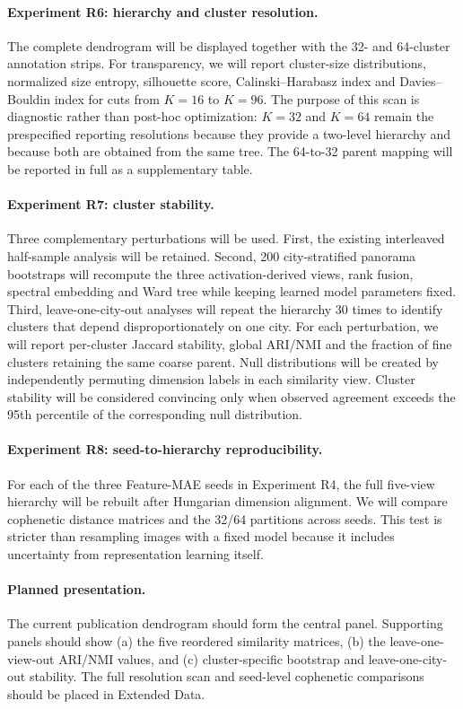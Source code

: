 \paragraph{Experiment R6: hierarchy and cluster resolution.}
The complete dendrogram will be displayed together with the 32- and 64-cluster
annotation strips. For transparency, we will report cluster-size distributions,
normalized size entropy, silhouette score, Calinski--Harabasz index and
Davies--Bouldin index for cuts from $K=16$ to $K=96$. The purpose of this scan is
diagnostic rather than post-hoc optimization: $K=32$ and $K=64$ remain the
prespecified reporting resolutions because they provide a two-level hierarchy
and because both are obtained from the same tree. The 64-to-32 parent mapping
will be reported in full as a supplementary table.

\paragraph{Experiment R7: cluster stability.}
Three complementary perturbations will be used. First, the existing interleaved
half-sample analysis will be retained. Second, 200 city-stratified panorama
bootstraps will recompute the three activation-derived views, rank fusion,
spectral embedding and Ward tree while keeping learned model parameters fixed.
Third, leave-one-city-out analyses will repeat the hierarchy 30 times to identify
clusters that depend disproportionately on one city. For each perturbation, we
will report per-cluster Jaccard stability, global ARI/NMI and the fraction of
fine clusters retaining the same coarse parent. Null distributions will be
created by independently permuting dimension labels in each similarity view.
Cluster stability will be considered convincing only when observed agreement
exceeds the 95th percentile of the corresponding null distribution.

\paragraph{Experiment R8: seed-to-hierarchy reproducibility.}
For each of the three Feature-MAE seeds in Experiment R4, the full five-view
hierarchy will be rebuilt after Hungarian dimension alignment. We will compare
cophenetic distance matrices and the 32/64 partitions across seeds. This test is
stricter than resampling images with a fixed model because it includes
uncertainty from representation learning itself.

\paragraph{Planned presentation.}
The current publication dendrogram should form the central panel. Supporting
panels should show (a) the five reordered similarity matrices, (b) the
leave-one-view-out ARI/NMI values, and (c) cluster-specific bootstrap and
leave-one-city-out stability. The full resolution scan and seed-level
cophenetic comparisons should be placed in Extended Data.

